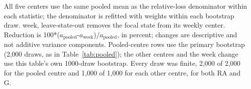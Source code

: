 \vspace{-.5\baselineskip}
\noindent\begin{minipage}{\linewidth}\footnotesize\raggedright
All five centers use the same pooled mean as the relative-loss denominator within each statistic; the denominator is refitted with weights within each bootstrap draw. week, leave-state-out removes the focal state from its weekly center. Reduction is 100*($a_{\mathrm{pooled}}$-$a_{\mathrm{week}}$)/$a_{\mathrm{pooled}}$, in percent; changes are descriptive and not additive variance components. Pooled-centre rows use the primary bootstrap (2,000 draws, as in Table~\ref{tab:pooled}); the other centres and the week change use this table's own 1000-draw bootstrap. Every draw was finite, 2,000 of 2,000 for the pooled centre and 1,000 of 1,000 for each other centre, for both RA and G.
\end{minipage}\par
\endgroup
